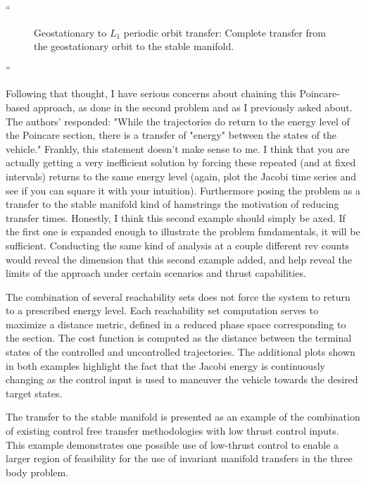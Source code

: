 \documentclass[11pt]{article}
\newenvironment{correction}{\begin{list}{}{\setlength{\leftmargin}{1cm}\setlength{\rightmargin}{1cm}}\vspace{\parsep}\item[]``}{''\end{list}}
\begin{document}
\begin{itemize}
\begin{correction}
\begin{figure}
        \caption{Geostationary to \( L_1 \) periodic orbit transfer: Complete transfer from the geostationary orbit to the stable manifold.\label{fig:geo_transfer}}
\end{figure}
        \end{correction}
    \item 
        \begin{itshape}
            Following that thought, I have serious concerns about chaining this Poincare-based approach, as done in the second problem and as I previously asked about.  The authors' responded: "While the trajectories do return to the energy level of the Poincare section, there is a transfer of "energy" between the states of the vehicle." Frankly, this statement doesn't make sense to me.  I think that you are actually getting a very inefficient solution by forcing these repeated (and at fixed intervals) returns to the same energy level (again, plot the Jacobi time series and see if you can square it with your intuition).  Furthermore posing the problem as a transfer to the stable manifold kind of hamstrings the motivation of reducing transfer times.  Honestly, I think this second example should simply be axed.  If the first one is expanded enough to illustrate the problem fundamentals, it will be sufficient.  Conducting the same kind of analysis at a couple different rev counts would
            reveal the dimension that this second example added, and help reveal the limits of the approach under certain scenarios and thrust capabilities.
        \end{itshape}

        The combination of several reachability sets does not force the system to return to a prescribed energy level.
        Each reachability set computation serves to maximize a distance metric, defined in a reduced phase space corresponding to the \Poincare section.
        The cost function is computed as the distance between the terminal states of the controlled and uncontrolled trajectories.
        The additional plots shown in both examples highlight the fact that the Jacobi energy is continuously changing as the control input is used to maneuver the vehicle towards the desired target states.

        The transfer to the stable manifold is presented as an example of the combination of existing control free  transfer methodologies with low thrust control inputs.
        This example demonstrates one possible use of low-thrust control to enable a larger region of feasibility for the use of invariant manifold transfers in the three body problem. 


\end{itemize}
\end{document}
